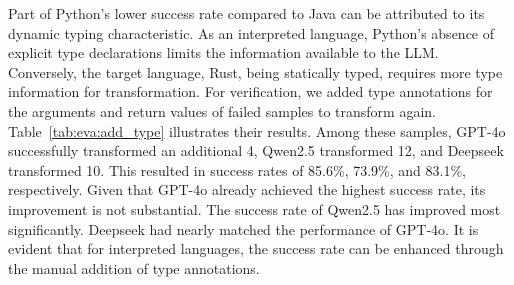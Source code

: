 Part of Python's lower success rate compared to Java can be attributed to its dynamic typing characteristic.
As an interpreted language, Python's absence of explicit type declarations limits the information available to the LLM.
Conversely, the target language, Rust, being statically typed, requires more type information for transformation.
For verification, we added type annotations for the arguments and return values of failed samples to transform again.
Table~\ref{tab:eva:add_type} illustrates their results.
Among these samples, GPT-4o successfully transformed an additional 4, Qwen2.5 transformed 12, and Deepseek transformed 10.
This resulted in success rates of 85.6\%, 73.9\%, and 83.1\%, respectively.
Given that GPT-4o already achieved the highest success rate, its improvement is not substantial.
The success rate of Qwen2.5 has improved most significantly.
Deepseek had nearly matched the performance of GPT-4o.
It is evident that for interpreted languages, the success rate can be enhanced through the manual addition of type annotations.



